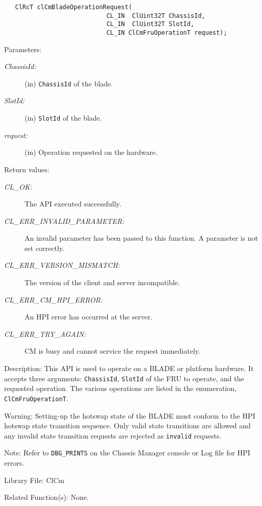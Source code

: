 \begin{flushleft}
\begin{Desc}
\footnotesize\begin{verbatim}   ClRcT clCmBladeOperationRequest(
              				CL_IN  ClUint32T ChassisId,
              				CL_IN  ClUint32T SlotId,
              				CL_IN ClCmFruOperationT request);
\end{verbatim}	
\normalsize
\end{Desc}
\begin{Desc}
\item[Parameters:]
\begin{description}
\item[{\em Chassis\-Id:}](in) {\tt{Chassis\-Id}} of the blade. 
\item[{\em Slot\-Id:}](in) {\tt{Slot\-Id}} of the blade. 
\item[{\em request:}](in) Operation requested on the hardware.\end{description}
\end{Desc}
\begin{Desc}
\item[Return values:]
\begin{description}
\item[{\em CL\_\-OK:}]The API executed successfully. 
\item[{\em CL\_\-ERR\_\-INVALID\_\-PARAMETER:}]An invalid parameter has been passed to this function. A parameter is not set correctly.
\item[{\em CL\_\-ERR\_\-VERSION\_\-MISMATCH:}]The version of the client and server incompatible. 
\item[{\em CL\_\-ERR\_\-CM\_\-HPI\_\-ERROR:}]An HPI error has occurred at the server. 
\item[{\em CL\_\-ERR\_\-TRY\_\-AGAIN:}]CM is busy and cannot service the request immediately.\end{description}
\end{Desc}
\begin{Desc}
\item[Description:]This API is used to operate on a BLADE or platform hardware. It accepts three arguments: {\tt{Chassis\-Id}}, {\tt{Slot\-Id}}
of the FRU to operate, and the requested operation. The various operations are listed in the enumeration, {\tt{Cl\-Cm\-Fru\-Operation\-T}}.\end{Desc}
\begin{Desc}
\item[Warning:]Setting-up the hotswap state of the BLADE must conform to the HPI hotswap state transition sequence. Only valid state transitions are 
allowed and any invalid state transition requests are rejected as {\tt{invalid}} requests.\end{Desc}
\begin{Desc}
\item[Note:]Refer to {\tt{DBG\_\-PRINTS}} on the Chassis Manager console or Log file for HPI errors.\end{Desc}
\begin{Desc}
\item[Library File:]Cl\-Cm\end{Desc}
\begin{Desc}
\item[Related Function(s):]None. \end{Desc}


\end{flushleft}
